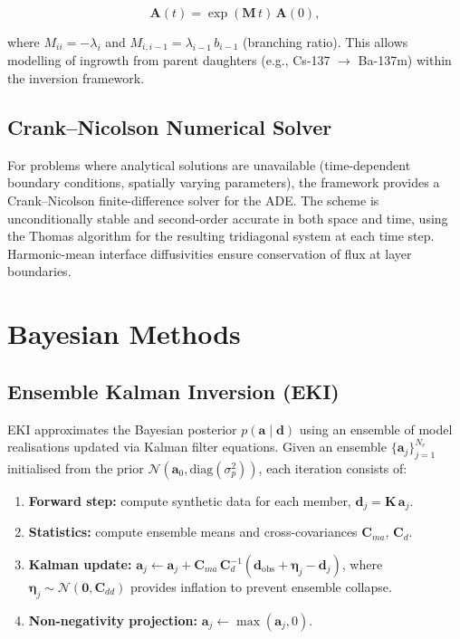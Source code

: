 \documentclass[a4paper,11pt]{article}
\begin{document}
\begin{equation}
  \bm{A}(t) = \exp(\bm{M}\,t)\,\bm{A}(0),
\end{equation}

where $M_{ii} = -\lambda_i$ and $M_{i,i-1} = \lambda_{i-1}\,b_{i-1}$
(branching ratio).  This allows modelling of ingrowth from parent
daughters (e.g., Cs-137 $\to$ Ba-137m) within the inversion framework.

\subsection{Crank--Nicolson Numerical Solver}

For problems where analytical solutions are unavailable (time-dependent
boundary conditions, spatially varying parameters), the framework
provides a Crank--Nicolson finite-difference solver for the ADE.  The
scheme is unconditionally stable and second-order accurate in both
space and time, using the Thomas algorithm for the resulting tridiagonal
system at each time step.  Harmonic-mean interface diffusivities ensure
conservation of flux at layer boundaries.


\section{Bayesian Methods}\label{sec:bayesian}

\subsection{Ensemble Kalman Inversion (EKI)}

EKI \citep{iglesias2013ensemble,laby2025regularised,tso2024ensemble}
approximates the Bayesian posterior $p(\bm{a} \mid \bm{d})$ using an
ensemble of model realisations updated via Kalman filter equations.
Given an ensemble $\{\bm{a}_j\}_{j=1}^{N_e}$ initialised from the prior
$\mathcal{N}(\bm{a}_0, \mathrm{diag}(\sigma_p^2))$, each iteration
consists of:

\begin{enumerate}
  \item \textbf{Forward step:} compute synthetic data for each member,
        $\bm{d}_j = \bm{K}\,\bm{a}_j$.
  \item \textbf{Statistics:} compute ensemble means and cross-covariances
        $\bm{C}_{ma}$, $\bm{C}_d$.
  \item \textbf{Kalman update:}
        $\bm{a}_j \leftarrow \bm{a}_j + \bm{C}_{ma}\,\bm{C}_d^{-1}(\bm{d}_{\mathrm{obs}} + \bm{\eta}_j - \bm{d}_j)$,
        where $\bm{\eta}_j \sim \mathcal{N}(\bm{0}, \bm{C}_{dd})$ provides
        inflation to prevent ensemble collapse.
  \item \textbf{Non-negativity projection:} $\bm{a}_j \leftarrow \max(\bm{a}_j, 0)$.
\end{enumerate}
\end{document}
